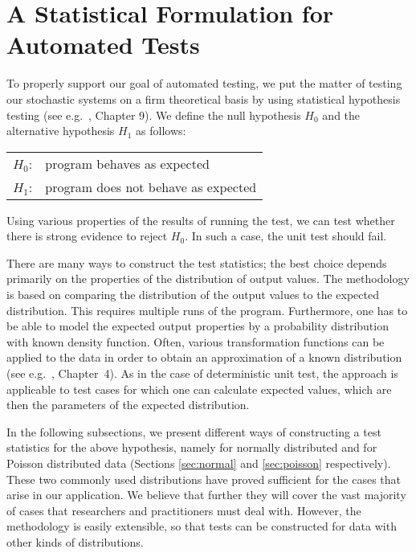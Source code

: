 
\section{A Statistical Formulation for Automated Tests}
\label{sec:statform}

To properly support our goal of automated testing, we put the matter
of testing our stochastic systems on a firm theoretical basis by using
statistical hypothesis testing (see e.g.\ \cite{mood-book-1974}, Chapter 9).
We define the null hypothesis $H_0$ and the alternative hypothesis
$H_1$ as follows:

\begin{tabular}{ll}
$H_0$: & program behaves as expected\\
$H_1$: & program does not behave as expected
\end{tabular}

Using various properties of the results of running the test, we can test
whether there is strong evidence to reject $H_0$. In such a case, the unit
test should fail.

There are many ways to construct the test statistics; the best choice depends
primarily on the properties of the distribution of output values.  The
methodology is based on comparing the distribution of the output values to the
expected distribution. This requires multiple runs of the program.
Furthermore, one has to be able to model the expected output properties by a
probability distribution with known density function. Often, various
transformation functions can be applied to the data in order to obtain an
approximation of a known distribution (see e.g.~\cite{Afifi&2004}, Chapter~4).
As in the case of deterministic unit test, the approach is applicable to test
cases for which one can calculate expected values, which are then the
parameters of the expected distribution.

In the following subsections, we present different ways of constructing a test
statistics for the above hypothesis, namely for normally distributed and for
Poisson distributed data (Sections \ref{sec:normal} and \ref{sec:poisson}
respectively).  These two commonly used distributions have proved sufficient
for the cases that arise in our application.  We believe that further they
will cover the vast majority of cases that researchers and practitioners must
deal with.  However, the methodology is easily extensible, so that tests can
be constructed for data with other kinds of distributions.

